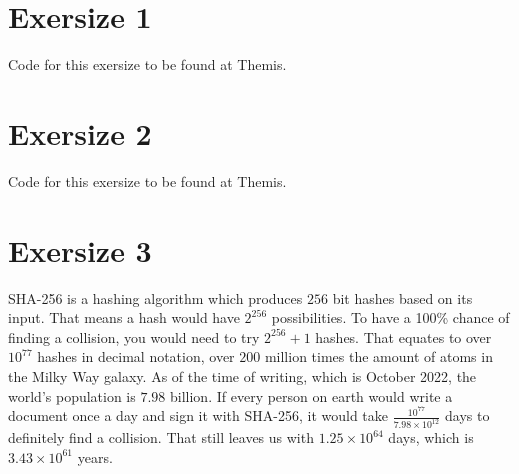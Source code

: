 \documentclass[twoside, a4paper, fleqn, reqno]{article}
\begin{document}
\maketitle

\section*{Exersize 1}
Code for this exersize to be found at Themis.

\section*{Exersize 2}
Code for this exersize to be found at Themis.

\section*{Exersize 3}
SHA-256 is a hashing algorithm which produces $256$ bit hashes based on its input.
That means a hash would have $2^{256}$ possibilities.
To have a 100\% chance of finding a collision, you would need to try $2^{256} + 1$ hashes.
That equates to over $10^{77}$ hashes in decimal notation, over $200$ million times the
amount of atoms in the Milky Way galaxy.
As of the time of writing, which is October 2022, the world's population is $7.98$ billion.
If every person on earth would write a document once a day and sign it with SHA-256,
it would take $\frac{10^{77}}{7.98\times10^{12}}$ days to definitely find a collision.
That still leaves us with $1.25\times10^{64}$ days, which is $3.43\times10^{61}$ years.
\end{document}

